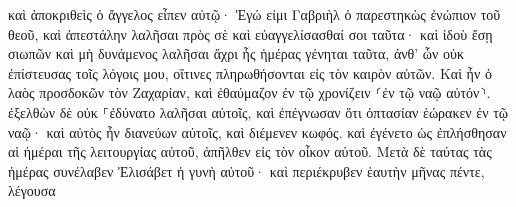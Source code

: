 \documentclass{openreader}
\begin{document}
καὶ ἀποκριθεὶς ὁ ἄγγελος εἶπεν αὐτῷ· Ἐγώ εἰμι Γαβριὴλ ὁ παρεστηκὼς ἐνώπιον τοῦ θεοῦ, καὶ ἀπεστάλην λαλῆσαι πρὸς σὲ καὶ εὐαγγελίσασθαί σοι ταῦτα· 
καὶ ἰδοὺ ἔσῃ σιωπῶν καὶ μὴ δυνάμενος λαλῆσαι ἄχρι ἧς ἡμέρας γένηται ταῦτα, ἀνθ’ ὧν οὐκ ἐπίστευσας τοῖς λόγοις μου, οἵτινες πληρωθήσονται εἰς τὸν καιρὸν αὐτῶν. 
Καὶ ἦν ὁ λαὸς προσδοκῶν τὸν Ζαχαρίαν, καὶ ἐθαύμαζον ἐν τῷ χρονίζειν ⸂ἐν τῷ ναῷ αὐτόν⸃. 
ἐξελθὼν δὲ οὐκ ⸀ἐδύνατο λαλῆσαι αὐτοῖς, καὶ ἐπέγνωσαν ὅτι ὀπτασίαν ἑώρακεν ἐν τῷ ναῷ· καὶ αὐτὸς ἦν διανεύων αὐτοῖς, καὶ διέμενεν κωφός. 
καὶ ἐγένετο ὡς ἐπλήσθησαν αἱ ἡμέραι τῆς λειτουργίας αὐτοῦ, ἀπῆλθεν εἰς τὸν οἶκον αὐτοῦ. 
Μετὰ δὲ ταύτας τὰς ἡμέρας συνέλαβεν Ἐλισάβετ ἡ γυνὴ αὐτοῦ· καὶ περιέκρυβεν ἑαυτὴν μῆνας πέντε, λέγουσα 
\end{document}
